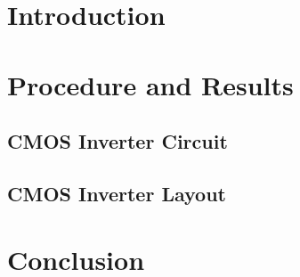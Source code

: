 \documentclass{article}
\begin{document}
\begin{titlepage}

\end{titlepage}
\section{Introduction}

\section{Procedure and Results}
\subsection{CMOS Inverter Circuit}

\subsection{CMOS Inverter Layout}

\section{Conclusion}

\end{document}
